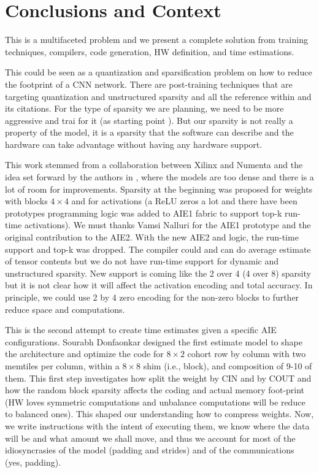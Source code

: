 \documentclass[conference]{IEEEtran}
\begin{document}
\section{Conclusions and Context}
This is a multifaceted problem and we present a complete solution from
training techniques, compilers, code generation, HW definition, and
time estimations.

This could be seen as a quantization and sparsification problem on how
to reduce the footprint of a CNN network. There are post-training
techniques that are targeting quantization and unstructured sparsity
\cite{frantar2023gptq} and all the reference within and its
citations. For the type of sparsity we are planning, we need to be
more aggressive and trai for it (as starting point
\cite{abs-2102-11289}).  But our sparsity is not really a property of
the model, it is a sparsity that the software can describe and the
hardware can take advantage without having any hardware support.

This work stemmed from a collaboration between Xilinx and Numenta and
the idea set forward by the authors in \cite{ahmad2019dense}, where
the models are too dense and there is a lot of room for
improvements. Sparsity at the beginning was proposed for weights with
blocks $4\times 4$ and for activations (a ReLU zeros a lot and there
have been prototypes programming logic was added to AIE1 fabric to
support top-k run-time activations). We must thanks Vamsi Nalluri for
the AIE1 prototype and the original contribution to the AIE2. With the
new AIE2 and logic, the run-time support and top-k was dropped. The
compiler could and can do average estimate of tensor contents but we
do not have run-time support for dynamic and unstructured
sparsity. New support is coming like the 2 over 4 (4 over 8) sparsity
but it is not clear how it will affect the activation encoding and
total accuracy. In principle, we could use 2 by 4 zero encoding for
the non-zero blocks to further reduce space and computations.

This is the second attempt to create time estimates given a specific
AIE configurations. Sourabh Donfaonkar designed the first estimate
model to shape the architecture and optimize the code for $8\times 2$
cohort row by column with two memtiles per column, within a $8\times
8$ shim (i.e., block), and composition of 9-10 of them. This first
step investigates how split the weight by CIN and by COUT and how the
random block sparsity affects the coding and actual memory foot-print
(HW loves symmetric computations and unbalance computations will
be reduce to balanced ones). This shaped our understanding how to
compress weights. Now, we write instructions with the intent of
executing them, we know where the data will be and what amount we
shall move, and thus we account for most of the idiosyncrasies of the
model (padding and strides) and of the communications (yes, padding).
\end{document}
